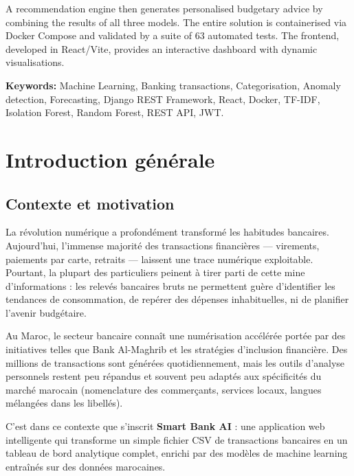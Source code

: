\documentclass[12pt,a4paper]{report}
\begin{document}
A recommendation engine then generates personalised budgetary advice by
combining the results of all three models. The entire solution is
containerised via Docker Compose and validated by a suite of 63 automated
tests. The frontend, developed in React/Vite, provides an interactive
dashboard with dynamic visualisations.

\vspace{0.5cm}
\textbf{Keywords:} Machine Learning, Banking transactions, Categorisation,
Anomaly detection, Forecasting, Django REST Framework, React, Docker, TF-IDF,
Isolation Forest, Random Forest, REST API, JWT.

\tableofcontents
\listoffigures
\listoftables

\chapter{Introduction générale}

\section{Contexte et motivation}

La révolution numérique a profondément transformé les habitudes bancaires.
Aujourd'hui, l'immense majorité des transactions financières — virements,
paiements par carte, retraits — laissent une trace numérique exploitable.
Pourtant, la plupart des particuliers peinent à tirer parti de cette mine
d'informations : les relevés bancaires bruts ne permettent guère d'identifier
les tendances de consommation, de repérer des dépenses inhabituelles, ni
de planifier l'avenir budgétaire.

Au Maroc, le secteur bancaire connaît une numérisation accélérée portée par
des initiatives telles que Bank Al-Maghrib et les stratégies d'inclusion
financière. Des millions de transactions sont générées quotidiennement, mais
les outils d'analyse personnels restent peu répandus et souvent peu adaptés
aux spécificités du marché marocain (nomenclature des commerçants, services
locaux, langues mélangées dans les libellés).

C'est dans ce contexte que s'inscrit \textbf{Smart Bank AI} : une application
web intelligente qui transforme un simple fichier CSV de transactions bancaires
en un tableau de bord analytique complet, enrichi par des modèles de machine
learning entraînés sur des données marocaines.
\end{document}
